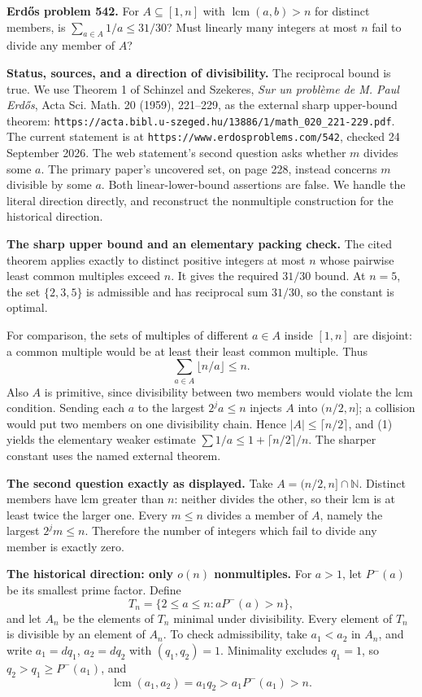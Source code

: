 \textbf{Erd\H{o}s problem 542.}
For $A\subseteq[1,n]$ with $\operatorname{lcm}(a,b)>n$ for distinct members, is $\sum_{a\in A}1/a\leq31/30$? Must linearly many integers at most $n$ fail to divide any member of $A$?

\textbf{Status, sources, and a direction of divisibility.}
The reciprocal bound is true. We use Theorem 1 of Schinzel and Szekeres, \emph{Sur un probl\`eme de M. Paul Erd\H{o}s}, Acta Sci. Math. 20 (1959), 221--229, as the external sharp upper-bound theorem:
\texttt{https://acta.bibl.u-szeged.hu/13886/1/math\_020\_221-229.pdf}.
The current statement is at \texttt{https://www.erdosproblems.com/542}, checked 24 September 2026.
The web statement's second question asks whether $m$ divides some $a$. The primary paper's uncovered set, on page 228, instead concerns $m$ divisible by some $a$. Both linear-lower-bound assertions are false. We handle the literal direction directly, and reconstruct the nonmultiple construction for the historical direction.

\textbf{The sharp upper bound and an elementary packing check.}
The cited theorem applies exactly to distinct positive integers at most $n$ whose pairwise least common multiples exceed $n$. It gives the required $31/30$ bound. At $n=5$, the set $\{2,3,5\}$ is admissible and has reciprocal sum $31/30$, so the constant is optimal.

For comparison, the sets of multiples of different $a\in A$ inside $[1,n]$ are disjoint: a common multiple would be at least their least common multiple. Thus
\[
 \sum_{a\in A}\lfloor n/a\rfloor\leq n.                 \tag{1}
\]
Also $A$ is primitive, since divisibility between two members would violate the lcm condition. Sending each $a$ to the largest $2^ja\leq n$ injects $A$ into $(n/2,n]$; a collision would put two members on one divisibility chain. Hence $|A|\leq\lceil n/2\rceil$, and (1) yields the elementary weaker estimate
$\sum1/a\leq1+\lceil n/2\rceil/n$. The sharper constant uses the named external theorem.

\textbf{The second question exactly as displayed.}
Take $A=(n/2,n]\cap\mathbb N$. Distinct members have lcm greater than $n$: neither divides the other, so their lcm is at least twice the larger one. Every $m\leq n$ divides a member of $A$, namely the largest $2^jm\leq n$. Therefore the number of integers which fail to divide any member is exactly zero.

\textbf{The historical direction: only $o(n)$ nonmultiples.}
For $a>1$, let $P^-(a)$ be its smallest prime factor. Define
\[
 T_n=\{2\leq a\leq n:aP^-(a)>n\},
\]
and let $A_n$ be the elements of $T_n$ minimal under divisibility. Every element of $T_n$ is divisible by an element of $A_n$.
To check admissibility, take $a_1<a_2$ in $A_n$, and write
$a_1=dq_1$, $a_2=dq_2$ with $(q_1,q_2)=1$. Minimality excludes $q_1=1$, so $q_2>q_1\geq P^-(a_1)$, and
\[
 \operatorname{lcm}(a_1,a_2)=a_1q_2>a_1P^-(a_1)>n.
\]

